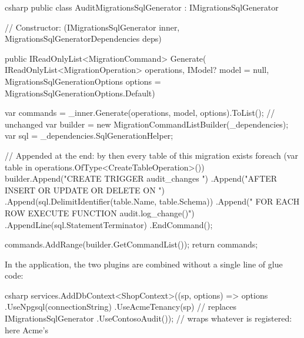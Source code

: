 \begin{sourcecode}{csharp}
public class AuditMigrationsSqlGenerator : IMigrationsSqlGenerator
{
    // Constructor: (IMigrationsSqlGenerator inner, MigrationsSqlGeneratorDependencies deps)

    public IReadOnlyList<MigrationCommand> Generate(
        IReadOnlyList<MigrationOperation> operations,
        IModel? model = null,
        MigrationsSqlGenerationOptions options = MigrationsSqlGenerationOptions.Default)
    {
        var commands = _inner.Generate(operations, model, options).ToList();   // unchanged
        var builder = new MigrationCommandListBuilder(_dependencies);
        var sql = _dependencies.SqlGenerationHelper;

        // Appended at the end: by then every table of this migration exists
        foreach (var table in operations.OfType<CreateTableOperation>())
        {
            builder.Append("CREATE TRIGGER audit_changes ")
                .Append("AFTER INSERT OR UPDATE OR DELETE ON ")
                .Append(sql.DelimitIdentifier(table.Name, table.Schema))
                .Append(" FOR EACH ROW EXECUTE FUNCTION audit.log_change()")
                .AppendLine(sql.StatementTerminator)
                .EndCommand();
        }

        commands.AddRange(builder.GetCommandList());
        return commands;
    }
}
\end{sourcecode}

In the application, the two plugins are combined without a single line of glue code:

\begin{sourcecode}{csharp}
services.AddDbContext<ShopContext>((sp, options) => options
    .UseNpgsql(connectionString)
    .UseAcmeTenancy(sp)       // replaces IMigrationsSqlGenerator
    .UseContosoAudit());      // wraps whatever is registered: here Acme's
\end{sourcecode}

